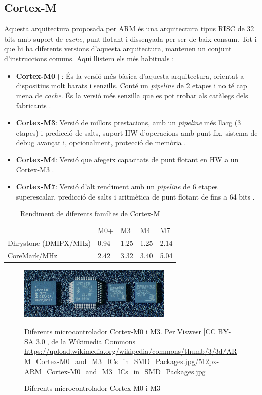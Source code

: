 \subsection{Cortex-M}
Aquesta arquitectura proposada per ARM és una arquitectura tipus RISC de 32 bits amb suport de {\em cache}, punt flotant i dissenyada per ser de baix consum. Tot i que hi ha diferents versions d'aquesta arquitectura, mantenen un conjunt d'instruccions comuns. Aquí llistem els més habituals \cite[7]{EmbeddedBook}:

\begin{itemize}
 \item {\bf Cortex-M0+}: És la versió més bàsica d'aquesta arquitectura, orientat a dispositius molt barats i senzills. Conté un {\em pipeline} de 2 etapes i no té cap mena de {\em cache}. És la versió més senzilla que es pot trobar als catàlegs dels fabricants \cite{CortexM0}.
 \item {\bf Cortex-M3}: Versió de millors prestacions, amb un {\em pipeline} més llarg (3 etapes) i predicció de salts, suport HW d'operacions amb punt fix, sistema de debug avançat i, opcionalment, protecció de memòria \cite{CortexM3}.
 \item {\bf Cortex-M4}: Versió que afegeix capacitats de punt flotant en HW a un Cortex-M3 \cite{CortexM4}.
 \item {\bf Cortex-M7}: Versió d'alt rendiment amb un {\em pipeline} de 6 etapes superescalar, predicció de salts i aritmètica de punt flotant de fins a 64 bits \cite{CortexM7}.
\end{itemize}

\begin{table}
\caption{Rendiment de diferents famílies de Cortex-M \cite[22]{DesignersGuide}}
\centering
\begin{tabular}{lllll}
 & M0+ & M3 & M4 & M7\\
Dhrystone (DMIPX/MHz) & 0.94 & 1.25 & 1.25 & 2.14\\
CoreMark/MHz & 2.42 & 3.32 & 3.40 & 5.04\\
\end{tabular}
\label{tab:ARMPerformances}
\end{table}



\begin{figure}
 \centering
 \includegraphics[width=0.65\textwidth, keepaspectratio]{imatges/ARM_Cortex-M0}
 \caption{Diferents microcontrolador Cortex-M0 i M3}{Diferents microcontrolador Cortex-M0 i M3. Per Viswesr [CC BY-SA 3.0], de la Wikimedia Commons \url{https://upload.wikimedia.org/wikipedia/commons/thumb/3/3d/ARM_Cortex-M0_and_M3_ICs_in_SMD_Packages.jpg/512px-ARM_Cortex-M0_and_M3_ICs_in_SMD_Packages.jpg}}
 \label{fig:STAsic}
\end{figure}

